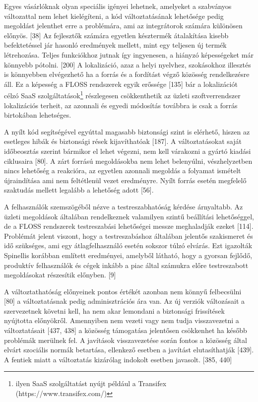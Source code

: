 \documentclass[12pt,magyar,a4paper,oneside]{scrreprt}
\begin{document}
Egyes vásárlóknak olyan speciális igényei lehetnek, amelyeket a
szabványos változattal nem lehet kielégíteni, a kód változtatásának
lehetősége pedig megoldást jelenthet erre a problémára, ami az
integrátorok számára különösen előnyös. {[}38{]} Az fejlesztők számára
egyetlen késztermék átalakítása kisebb befektetéssel jár hasonló
eredmények mellett, mint egy teljesen új termék létrehozása. Teljes
funkciókhoz jutnak így ingyenesen, a hiányzó képességeket már könnyebb
pótolni. {[}200{]} A lokalizáció, azaz a helyi nyelvhez, szokásokhoz
illesztés is könnyebben elvégezhető ha a forrás és a fordítást végző
közösség rendelkezésre áll. Ez a képesség a FLOSS rendszerek egyik
erőssége {[}135{]} bár a lokalizációt célzó SaaS
szolgáltatások\footnote{ilyen SaaS szolgáltatást nyújt például a
  Transifex (https://www.transifex.com/)} részlegesen csökkenthetik az
üzleti szoftverrendszer lokalizációs terheit, az azonnali és egyedi
módosítás továbbra is csak a forrás birtokában lehetséges.

A nyílt kód segítségével egyúttal magasabb biztonsági szint is elérhető,
hiszen az esetleges hibák és biztonsági rések kijavíthatóak {[}187{]}. A
változtatásokat saját időbeosztás szerint bármikor el lehet végezni, nem
kell várakozni a gyártó kiadási ciklusaira {[}80{]}. A zárt forrású
megoldásokba nem lehet belenyúlni, vészhelyzetben nincs lehetőség a
reakcióra, az egyetlen azonnali megoldás a folyamat ismételt
újraindítása ami nem feltétlenül vezet eredményre. Nyílt forrás esetén
megfelelő szaktudás mellett legalább a lehetőség adott {[}56{]}.

A felhasználók szemszögéből nézve a testreszabhatóság kérdése
árnyaltabb. Az üzleti megoldások általában rendelkeznek valamilyen
szintű beállítási lehetőséggel, de a FLOSS rendszerek testreszabási
lehetőségei messze meghaladják ezeket {[}114{]}. Problémát jelent
viszont, hogy a testreszabáshoz általában jelentős szakismeret és idő
szükséges, ami egy átlagfelhasználó esetén sokszor túlzó elvárás. Ezt
igazolták Spinellis korábban említett eredményei, amelyből látható, hogy
a gyorsan fejlődő, produktív felhasználók és cégek inkább a piac által
számukra előre testreszabott megoldásokat részesítik előnyben. {[}9{]}

A változtathatóság előnyeinek pontos értékét azonban nem könnyű
felbecsülni {[}80{]} a változtatásnak pedig adminisztrációs ára van. Az
új verziók változásait a szervezetnek követni kell, ha nem akar
lemondani a biztonsági frissítések nyújtotta előnyökről. Amennyiben nem
vezeti vagy nem tudja visszavezetni a változtatásait {[}437, 438{]} a
közösség támogatása jelentősen csökkenhet ha később problémák merülnek
fel. A javítások visszavezetése során fontos a közösség által elvárt
szociális normák betartása, ellenkező esetben a javítást elutasíthatják
{[}439{]}. A fentiek miatt a változtatás kizárólag indokolt esetben
javasolt. {[}385, 440{]}
\end{document}
